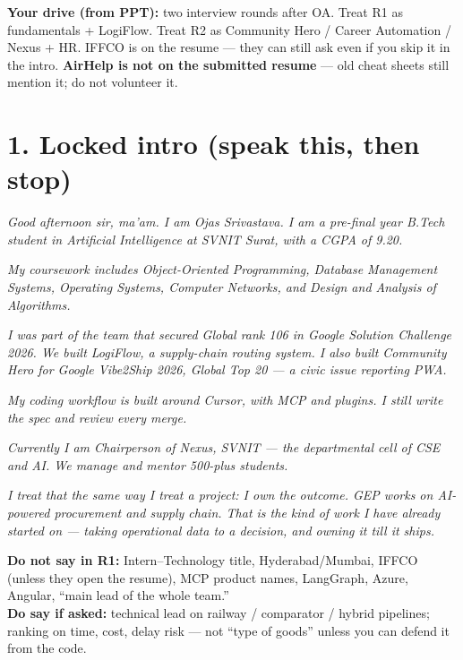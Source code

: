 \documentclass[a4paper,9.5pt]{extarticle}
\begin{document}
\textbf{Your drive (from PPT):} two interview rounds after OA. Treat R1 as fundamentals + LogiFlow. Treat R2 as Community Hero / Career Automation / Nexus + HR. IFFCO is on the resume --- they can still ask even if you skip it in the intro. \textbf{AirHelp is not on the submitted resume} --- old cheat sheets still mention it; do not volunteer it.

\section{1. Locked intro (speak this, then stop)}
\textit{Good afternoon sir, ma'am. I am Ojas Srivastava. I am a pre-final year B.Tech student in Artificial Intelligence at SVNIT Surat, with a CGPA of 9.20.}

\textit{My coursework includes Object-Oriented Programming, Database Management Systems, Operating Systems, Computer Networks, and Design and Analysis of Algorithms.}

\textit{I was part of the team that secured Global rank 106 in Google Solution Challenge 2026. We built LogiFlow, a supply-chain routing system. I also built Community Hero for Google Vibe2Ship 2026, Global Top 20 --- a civic issue reporting PWA.}

\textit{My coding workflow is built around Cursor, with MCP and plugins. I still write the spec and review every merge.}

\textit{Currently I am Chairperson of Nexus, SVNIT --- the departmental cell of CSE and AI. We manage and mentor 500-plus students.}

\textit{I treat that the same way I treat a project: I own the outcome. GEP works on AI-powered procurement and supply chain. That is the kind of work I have already started on --- taking operational data to a decision, and owning it till it ships.}

\vspace{2pt}
\noindent\textbf{Do not say in R1:} Intern--Technology title, Hyderabad/Mumbai, IFFCO (unless they open the resume), MCP product names, LangGraph, Azure, Angular, ``main lead of the whole team.''\\
\textbf{Do say if asked:} technical lead on railway / comparator / hybrid pipelines; ranking on time, cost, delay risk --- not ``type of goods'' unless you can defend it from the code.
\end{document}
